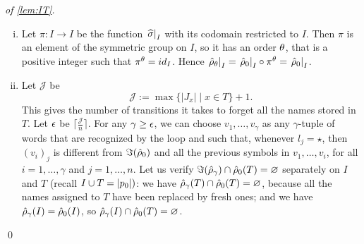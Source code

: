 \begin{proof}[of \cref{lem:IT}]\hfill
\begin{enumerate}[(i)]


\item Let $\pi \colon I \to I$ be the function $\left.\widehat{\sigma}\right|_{I}$ with its codomain restricted to $I$. Then $\pi$ is an element of the symmetric group on $I$, so it has an order $\theta$, that is a positive integer such that $\pi^\theta = id_I$. Hence $\left. \hat{\rho}_\theta \right|_{ I } =\left. \hat{\rho}_0 \right|_{I} \circ \pi^\theta = \left. \hat{\rho}_0 \right|_{I}$.


\item
Let $\mathcal{J}$ be
\[
	\mathcal{J} := \max \{ |J_x|\mid x \in T \} + 1 .
\]
This gives the number of transitions it takes to forget all the names stored in $T$. Let $\epsilon$ be $\lceil \frac{\mathcal{J}}{n} \rceil$. For any $\gamma \geq \epsilon$, we can choose $v_1,\dots,v_\gamma$ as any $\gamma$-tuple of words that are recognized by the loop and such that, whenever $l_j = \star$, then $(v_i)_j$ is different from $\Im(\hat{\rho}_0)$ and all the previous symbols in $v_1,\dots,v_i$, for all $i=1,\dots,\gamma$ and $j=1,\dots,n$. Let us verify $\Im(\hat{\rho}_\gamma) \cap \hat{\rho}_0(T) = \varnothing$ separately on $I$ and $T$ (recall $I \cup T = |p_0|)$: we have $\hat{\rho}_\gamma(T) \cap \hat{\rho}_0(T) = \varnothing$, because all the names assigned to $T$ have been replaced by fresh ones; and we have $\hat{\rho}_\gamma(I) = \hat{\rho}_0(I)$, so $\hat{\rho}_\gamma(I) \cap \hat{\rho}_0(T) = \varnothing$.
\end{enumerate}
\qed
\end{proof}


